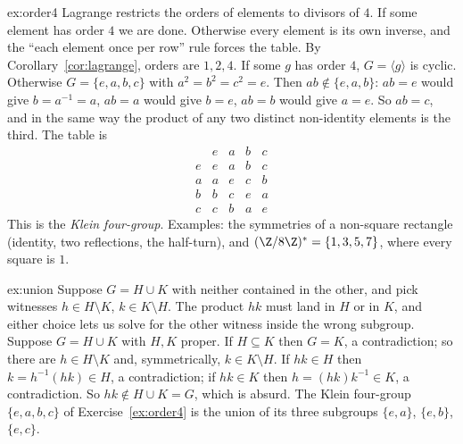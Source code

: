 \begin{solution}{ex:order4}
\idea Lagrange restricts the orders of elements to divisors of $4$. If some element has order $4$ we are done. Otherwise every element is its own inverse, and the ``each element once per row'' rule forces the table.
\writeup By Corollary~\ref{cor:lagrange}, orders are $1,2,4$. If some $g$ has order $4$, $G=\langle g\rangle$ is cyclic. Otherwise $G=\{e,a,b,c\}$ with $a^2=b^2=c^2=e$. Then $ab\notin\{e,a,b\}$: $ab=e$ would give $b=a^{-1}=a$, $ab=a$ would give $b=e$, $ab=b$ would give $a=e$. So $ab=c$, and in the same way the product of any two distinct non-identity elements is the third. The table is
\[
\begin{array}{c|cccc}&e&a&b&c\\\hline e&e&a&b&c\\a&a&e&c&b\\b&b&c&e&a\\c&c&b&a&e\end{array}
\]
This is the \emph{Klein four-group}. Examples: the symmetries of a non-square rectangle (identity, two reflections, the half-turn), and $(\Z/8\Z)^*=\{1,3,5,7\}$, where every square is $1$.
\end{solution}

\begin{solution}{ex:union}
\idea Suppose $G=H\cup K$ with neither contained in the other, and pick witnesses $h\in H\setminus K$, $k\in K\setminus H$. The product $hk$ must land in $H$ or in $K$, and either choice lets us solve for the other witness inside the wrong subgroup.
\writeup Suppose $G=H\cup K$ with $H,K$ proper. If $H\subseteq K$ then $G=K$, a contradiction; so there are $h\in H\setminus K$ and, symmetrically, $k\in K\setminus H$. If $hk\in H$ then $k=h^{-1}(hk)\in H$, a contradiction; if $hk\in K$ then $h=(hk)k^{-1}\in K$, a contradiction. So $hk\notin H\cup K=G$, which is absurd.
The Klein four-group $\{e,a,b,c\}$ of Exercise~\ref{ex:order4} is the union of its three subgroups $\{e,a\}$, $\{e,b\}$, $\{e,c\}$.
\end{solution}

